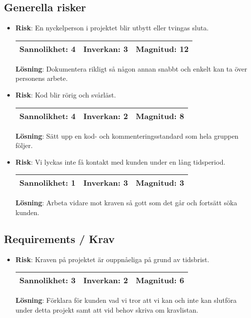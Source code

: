 \subsection{Generella risker}
\begin{itemize}
\item \textbf{Risk}: En nyckelperson i projektet blir utbytt eller tvingas sluta.

\begin{tabular}{ | l | l | l |}
	\hline
	Sannolikhet: 4 & Inverkan: 3 & Magnitud: 12 \\ \hline
\end{tabular}

\textbf{Lösning}: Dokumentera rikligt så någon annan snabbt och enkelt kan ta över personens arbete.
\item \textbf{Risk}: Kod blir rörig och svårläst.

\begin{tabular}{ | l | l | l |}
	\hline
	Sannolikhet: 4 & Inverkan: 2 & Magnitud: 8 \\ \hline
\end{tabular}

\textbf{Lösning}: Sätt upp en kod- och kommenteringsstandard som hela gruppen följer.
\item \textbf{Risk}: Vi lyckas inte få kontakt med kunden under en lång tidsperiod.

\begin{tabular}{ | l | l | l |}
	\hline
	Sannolikhet: 1 & Inverkan: 3 & Magnitud: 3 \\ \hline
\end{tabular}

\textbf{Lösning}: Arbeta vidare mot kraven så gott som det går och fortsätt söka kunden.
\end{itemize}

\subsection{Requirements / Krav}
\begin{itemize}
\item \textbf{Risk}: Kraven på projektet är ouppnåeliga på grund av tidsbrist.

\begin{tabular}{ | l | l | l |}
	\hline
	Sannolikhet: 3 & Inverkan: 2 & Magnitud: 6 \\ \hline
\end{tabular}

\textbf{Lösning}: Förklara för kunden vad vi tror att vi kan och inte kan slutföra under detta projekt samt att vid behov skriva om kravlistan.
\end{itemize}

